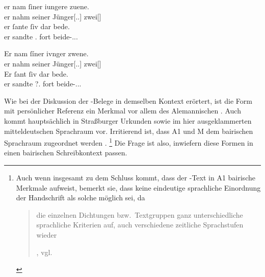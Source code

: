 \begin{exe}
\ex \label{ex:siubedea1m}
	\begin{xlist}
	\ex \label{ex:siubedea1m_1}
		\begin{taggedline}{\parencites[\pno~16vb,28--29]{kc:A1}}
		\gll er nam ſiner iungere zuene. \\
			er nahm seiner Jünger[\Gen.\Pl.\MascM] zwei[\MascM] \\
	\sn \gll er ſante ſiv dar bede. \\
			er sandte \Tpl\subM.\Acc{} fort beide-\Acc.\Pl.\MascM.\St{} \\
		\end{taggedline}
	
	\ex \label{ex:siubedea1m_2}
		\gll Er nam ſíner ivnger zwene. \\
			er nahm seiner Jünger[\Gen.\Pl.\MascM] zwei[\MascM] \\
	\sn \gll Er ſant ſiv dar bede. \\
			er sandte \Tpl\subM?.\Acc{} fort beide-\Acc.\Pl.\MascM.\St{} \\
		\begin{taggedline}{\parencites[\pno~29va,18--19]{kc:M}[3938]{schroeder1895}}
		\trans {}
		\end{taggedline}
\end{xlist}
\end{exe}

Wie bei der Diskussion der \CAO{}-Belege in demselben Kontext
erörtert, ist die Form  mit persönlicher Referenz ein Merkmal vor
allem des Alemannischen \autocite[vgl.][395]{ksw2}. Auch  kommt
hauptsächlich in Straßburger Urkunden sowie im hier ausgeklammerten
mitteldeutschen Sprachraum vor. Irritierend ist, dass A1 und
M dem bairischen Sprachraum zugeordnet werden
\autocites{wolf:kckat}[266--276]{fleischer2019}.%
%
	\footnote{Auch wenn \citet[40--41]{schneider1987} insgesamt zu dem Schluss
		kommt, dass der \KC{}-Text in A1 bairische Merkmale
		aufweist, bemerkt sie, dass keine eindeutige sprachliche Einordnung der
		Handschrift als solche möglich sei, da
		\blockquote[{\cite[40]{schneider1987},
		vgl.~\nosh\cites[519]{gaertner1999}[1638]{2vl11}}]{die einzelnen
		Dichtungen bzw.\ Textgruppen ganz unterschiedliche sprachliche
		Kriterien auf, \textelp{} auch verschiedene zeitliche
		Sprachstufen wieder }.%
	}
%
Die Frage ist also, inwiefern diese Formen in einen bairischen Schreib\-kontext
passen.

